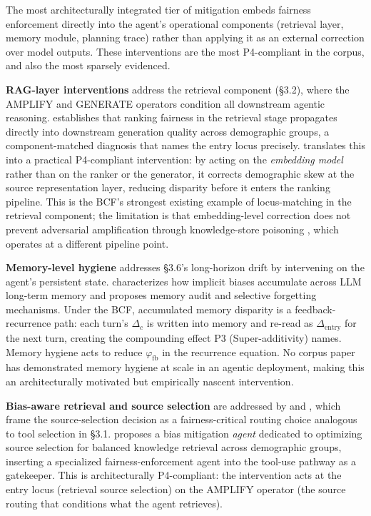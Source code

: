 \documentclass[acmsmall,nonacm]{acmart}
\begin{document}
The most architecturally integrated tier of mitigation embeds fairness enforcement directly into the agent's operational components (retrieval layer, memory module, planning trace) rather than applying it as an external correction over model outputs. These interventions are the most P4-compliant in the corpus, and also the most sparsely evidenced.

\textbf{RAG-layer interventions} address the retrieval component (\S{}3.2), where the AMPLIFY and GENERATE operators condition all downstream agentic reasoning. \cite{kim2024fair} establishes that ranking fairness in the retrieval stage propagates directly into downstream generation quality across demographic groups, a component-matched diagnosis that names the entry locus precisely. \cite{kim2025mitigating} translates this into a practical P4-compliant intervention: by acting on the \emph{embedding model} rather than on the ranker or the generator, it corrects demographic skew at the source representation layer, reducing disparity before it enters the ranking pipeline. This is the BCF's strongest existing example of locus-matching in the retrieval component; the limitation is that embedding-level correction does not prevent adversarial amplification through knowledge-store poisoning \cite{wang2025bias}, which operates at a different pipeline point.

\textbf{Memory-level hygiene} addresses \S{}3.6's long-horizon drift by intervening on the agent's persistent state. \cite{ma2026implicit} characterizes how implicit biases accumulate across LLM long-term memory and proposes memory audit and selective forgetting mechanisms. Under the BCF, accumulated memory disparity is a feedback-recurrence path: each turn's $\Delta_c$ is written into memory and re-read as $\Delta_{\mathrm{entry}}$ for the next turn, creating the compounding effect P3 (Super-additivity) names. Memory hygiene acts to reduce $\varphi_{\mathrm{fb}}$ in the recurrence equation. No corpus paper has demonstrated memory hygiene at scale in an agentic deployment, making this an architecturally motivated but empirically nascent intervention.

\textbf{Bias-aware retrieval and source selection} are addressed by \cite{singh2025bias} and \cite{singh2025biasb}, which frame the source-selection decision as a fairness-critical routing choice analogous to tool selection in \S{}3.1. \cite{singh2025biasb} proposes a bias mitigation \emph{agent} dedicated to optimizing source selection for balanced knowledge retrieval across demographic groups, inserting a specialized fairness-enforcement agent into the tool-use pathway as a gatekeeper. This is architecturally P4-compliant: the intervention acts at the entry locus (retrieval source selection) on the AMPLIFY operator (the source routing that conditions what the agent retrieves).
\end{document}
